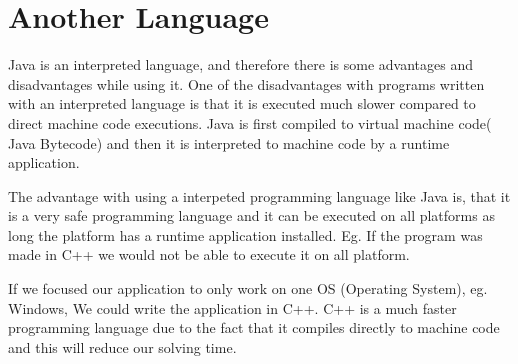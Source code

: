 \section{Another Language}
Java is an interpreted language, and therefore there is some advantages and disadvantages while using it. One of the disadvantages with programs written with an interpreted language is that it is executed much slower compared to direct machine code executions. Java is first compiled to virtual machine code( Java Bytecode) and then it is interpreted to machine code by a runtime application.

The advantage with using a interpeted programming language like Java is, that it is a very safe programming language and it can be executed on all platforms as long the platform has a runtime application installed. Eg. If the program was made in C++ we would not be able to execute it on all platform.

If we focused our application to only work on one OS (Operating System), eg. Windows, We could write the application in C++. C++ is a much faster programming language due to the fact that it compiles directly to machine code and this will reduce our solving time.